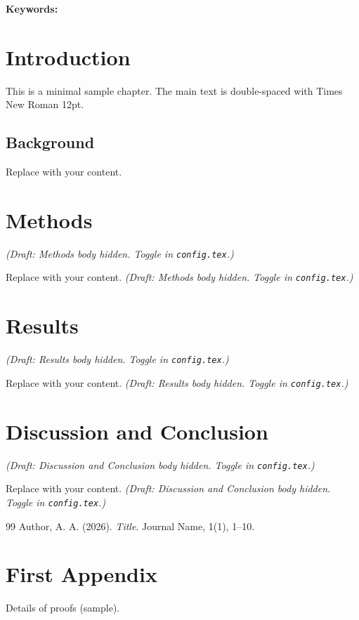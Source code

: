 \documentclass[12pt, a4paper]{report}
\newcommand{\DraftHiddenNote}[1]{%
  \noindent\textit{(Draft: #1 body hidden. Toggle in \texttt{config.tex}.)}\par
}
\begin{document}
  \vspace{1cm}\noindent \textbf{Keywords:} \KeywordsEN
  \clearpage
\fi

\tableofcontents
\clearpage

\ifIncludeLOF
  \listoffigures
  \clearpage
\fi

\ifIncludeLOT
  \listoftables
  \clearpage
\fi

\clearpage
{}
\setcounter{page}{1}

\chapter{Introduction}
This is a minimal sample chapter. The main text is double-spaced with Times New Roman 12pt.

\section{Background}
Replace with your content.


\chapter{Methods}
\ifDraftFastCompile
  \DraftHiddenNote{Methods}
\else
  \ifIncludeMethodsContent
    Replace with your content.
  \else
    \DraftHiddenNote{Methods}
  \fi
\fi


\chapter{Results}
\ifDraftFastCompile
  \DraftHiddenNote{Results}
\else
  \ifIncludeResultsContent
    Replace with your content.
  \else
    \DraftHiddenNote{Results}
  \fi
\fi


\chapter{Discussion and Conclusion}
\ifDraftFastCompile
  \DraftHiddenNote{Discussion and Conclusion}
\else
  \ifIncludeDiscussionContent
    Replace with your content.
  \else
    \DraftHiddenNote{Discussion and Conclusion}
  \fi
\fi


\clearpage
{}
\begin{thebibliography}{99}
 Author, A. A. (2026). \textit{Title}. Journal Name, 1(1), 1--10.
\end{thebibliography}

\ifIncludeAppendix
  \appendix
  \chapter{First Appendix}
  Details of proofs (sample).
\fi
\end{document}
